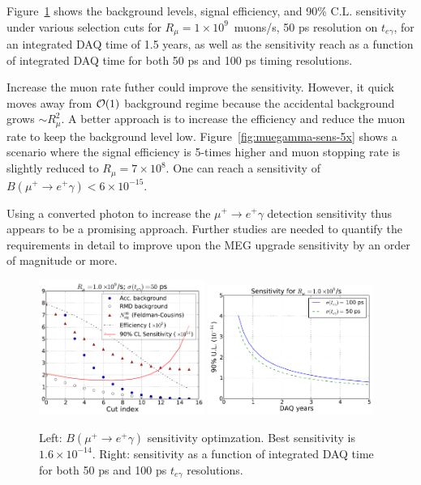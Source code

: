 Figure~\ref{fig:muegamma-sensitivity} shows the background levels, 
signal efficiency, and 90\%
C.L. sensitivity under various selection cuts for 
$R_\mu=1\times 10^{9}$~muons/s, 50 ps resolution on $t_{e\gamma}$, for
an integrated DAQ time of 1.5 years, as well as the sensitivity reach
as a function of integrated DAQ time for both 50 ps and 100 ps timing
resolutions. 

Increase the muon rate futher could improve the sensitivity. However,
it quick moves away from ${\cal O}(1)$ background regime because the accidental
background grows $\sim R_\mu^2$. A better approach is to increase the
efficiency and reduce the muon rate to keep the background level low. 
Figure~\ref{fig:muegamma-sens-5x} 
shows a scenario where the signal efficiency is 5-times higher
and muon stopping rate is slightly reduced to $R_\mu=7\times 10^{8}$. 
One can reach a sensitivity of $B(\mu^+\to e^+\gamma)<6\times 10^{-15}$.

Using a converted photon to increase the $\mu^+\to e^+\gamma$ detection
sensitivity thus appears to be a promising approach. Further studies are 
needed to quantify the requirements in detail to improve upon the MEG upgrade
sensitivity by an order of magnitude or more.

\begin{figure}[htbp]
   \centering
   \includegraphics[width=0.48\textwidth]{Figures/muegamma-sens-1e9-1p5y-50ps.pdf} 
   \includegraphics[width=0.48\textwidth]{Figures/muegamma-sens-years-1e9-2.pdf} 
   \caption{Left: $B(\mu^+\to e^+\gamma)$ sensitivity optimzation. 
Best sensitivity is $1.6\times 10^{-14}$. Right: sensitivity as a function of integrated DAQ time for both 50 ps and 100 ps $t_{e\gamma}$ resolutions.}
   \label{fig:muegamma-sensitivity}
\end{figure}

